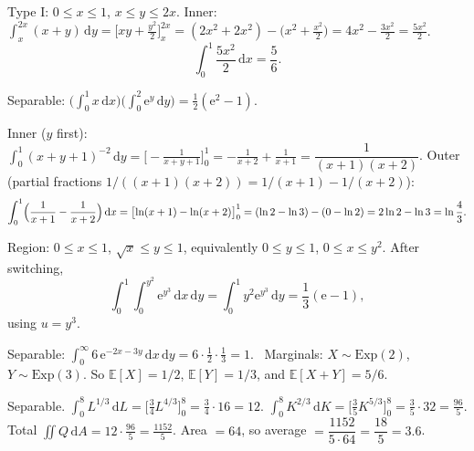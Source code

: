 \begin{solutions}
  \item Type I: $0\le x\le 1$, $x\le y\le 2x$. Inner:
        $\int_{x}^{2x}(x+y)\,\mathrm{d}y
        =\bigl[xy+\tfrac{y^{2}}{2}\bigr]_{x}^{2x}
        =(2x^{2}+2x^{2})-\bigl(x^{2}+\tfrac{x^{2}}{2}\bigr)
        =4x^{2}-\tfrac{3x^{2}}{2}=\tfrac{5x^{2}}{2}$.
        \[
          \int_{0}^{1} \frac{5x^{2}}{2}\,\mathrm{d}x=\frac{5}{6} .
        \]

  \item Separable:
        $\bigl(\int_{0}^{1} x\,\mathrm{d}x\bigr)\bigl(\int_{0}^{2} \mathrm{e}^{y}\,\mathrm{d}y\bigr)
        =\frac{1}{2}(\mathrm{e}^{2}-1)$.

  \item Inner ($y$ first): $\int_{0}^{1}(x+y+1)^{-2}\,\mathrm{d}y
        =\bigl[-\tfrac{1}{x+y+1}\bigr]_{0}^{1}
        =-\tfrac{1}{x+2}+\tfrac{1}{x+1}=\dfrac{1}{(x+1)(x+2)}$. Outer
        (partial fractions $1/((x+1)(x+2))=1/(x+1)-1/(x+2)$):
        \[
          \int_{0}^{1}\Bigl(\frac{1}{x+1}-\frac{1}{x+2}\Bigr)\,\mathrm{d}x
            =\bigl[\ln(x+1)-\ln(x+2)\bigr]_{0}^{1}
            =(\ln 2-\ln 3)-(0-\ln 2)
            =2\ln 2-\ln 3=\ln\frac{4}{3} .
        \]

  \item Region: $0\le x\le 1$, $\sqrt{x}\le y\le 1$, equivalently
        $0\le y\le 1$, $0\le x\le y^{2}$. After switching,
        \[
          \int_{0}^{1}\int_{0}^{y^{2}} \mathrm{e}^{y^{3}}\,\mathrm{d}x\,\mathrm{d}y
            =\int_{0}^{1} y^{2}\mathrm{e}^{y^{3}}\,\mathrm{d}y
            =\frac{1}{3}(\mathrm{e}-1) ,
        \]
        using $u=y^{3}$.

  \item Separable:
        $\int_{0}^{\infty} 6\,\mathrm{e}^{-2x-3y}\,\mathrm{d}x\,\mathrm{d}y
        =6\cdot\frac{1}{2}\cdot\frac{1}{3}=1$. \checkmark\
        Marginals: $X\sim\mathrm{Exp}(2)$, $Y\sim\mathrm{Exp}(3)$. So
        $\mathbb{E}[X]=1/2$, $\mathbb{E}[Y]=1/3$, and
        $\mathbb{E}[X+Y]=5/6$.

  \item Separable. $\int_{0}^{8} L^{1/3}\,\mathrm{d}L
        =\bigl[\tfrac34 L^{4/3}\bigr]_{0}^{8}=\frac{3}{4}\cdot 16=12$.
        $\int_{0}^{8} K^{2/3}\,\mathrm{d}K
        =\bigl[\tfrac35 K^{5/3}\bigr]_{0}^{8}=\frac{3}{5}\cdot 32=\frac{96}{5}$.
        Total $\iint Q\,\mathrm{d}A=12\cdot\frac{96}{5}=\frac{1152}{5}$.
        Area $=64$, so average
        $=\dfrac{1152}{5\cdot 64}=\dfrac{18}{5}=3.6$.
\end{solutions}
